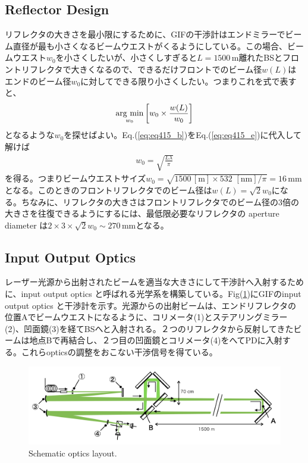 \subsection{Reflector Design}
リフレクタの大きさを最小限にするために、GIFの干渉計はエンドミラーでビーム直径が最も小さくなるビームウエストがくるようにしている。この場合、ビームウエスト$w_0$を小さくしたいが、小さくしすぎると$L=1500\,\mathrm{m}$離れたBSとフロントリフレクタで大きくなるので、できるだけフロントでのビーム径$w(L)$はエンドのビーム径$w_0$に対してできる限り小さくしたい。つまりこれを式で表すと、
\begin{eqnarray}
  \mathop{\rm arg~min}\limits_{w_0} \left[w_0\times\frac{w(L)}{w_0}\right] \label{eq:eq415_e}
\end{eqnarray}
となるような$w_0$を探せばよい。Eq.(\ref{eq:eq415_b})をEq.(\ref{eq:eq415_e})に代入して解けば
\begin{eqnarray}
  w_0 = \sqrt{\frac{{L\lambda}}{\pi}}
\end{eqnarray}
を得る。つまりビームウエストサイズ$w_0=\sqrt{{1500\,\mathrm{[m]}}\times 532\,\,\mathrm{[nm]}/\pi} = 16\,\mathrm{mm}$となる。このときのフロントリフレクタでのビーム径は$w(L)=\sqrt{2}{w_0}$になる。ちなみに、リフレクタの大きさはフロントリフレクタでのビーム径の3倍の大きさを往復できるようにするには、最低限必要なリフレクタの aperture diameter は$2\times3\times\sqrt{2}w_0\sim270\,\mathrm{mm}$となる。

\subsection{Input Output Optics}
レーザー光源から出射されたビームを適当な大きさにして干渉計へ入射するために、input output optics と呼ばれる光学系を構築している。Fig(\ref{img:img416})にGIFのinput output optics と干渉計を示す。光源からの出射ビームは、エンドリフレクタの位置Aでビームウエストになるように、コリメータ(1)とステアリングミラー(2)、凹面鏡(3)を経てBSへと入射される。２つのリフレクタから反射してきたビームは地点Bで再結合し、２つ目の凹面鏡とコリメータ(4)をへてPDに入射する。これらopticsの調整をおこない干渉信号を得ている\cite{miyo2017baseline}。

\begin{figure}[h]
  \begin{center}   
    \includegraphics[width=14cm]{./img_chap4/img416.png}
    \caption{Schematic optics layout.}\label{img:img416}
  \end{center}
\end{figure}


